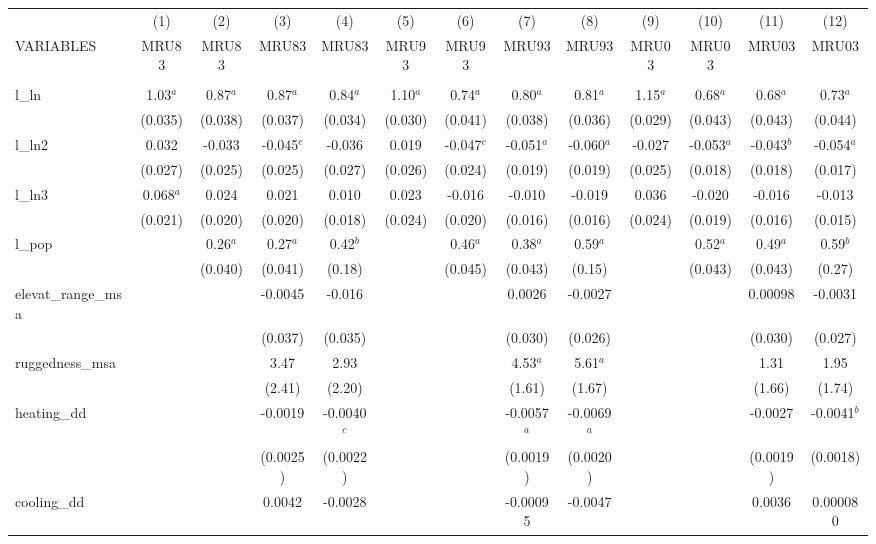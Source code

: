 \documentclass[]{article}
\begin{document}
\begin{tabular}{lcccccccccccc} \hline
 & (1) & (2) & (3) & (4) & (5) & (6) & (7) & (8) & (9) & (10) & (11) & (12) \\
VARIABLES & MRU83 & MRU83 & MRU83 & MRU83 & MRU93 & MRU93 & MRU93 & MRU93 & MRU03 & MRU03 & MRU03 & MRU03 \\ \hline
 &  &  &  &  &  &  &  &  &  &  &  &  \\
l\_ln & 1.03$^a$ & 0.87$^a$ & 0.87$^a$ & 0.84$^a$ & 1.10$^a$ & 0.74$^a$ & 0.80$^a$ & 0.81$^a$ & 1.15$^a$ & 0.68$^a$ & 0.68$^a$ & 0.73$^a$ \\
 & (0.035) & (0.038) & (0.037) & (0.034) & (0.030) & (0.041) & (0.038) & (0.036) & (0.029) & (0.043) & (0.043) & (0.044) \\
l\_ln2 & 0.032 & -0.033 & -0.045$^c$ & -0.036 & 0.019 & -0.047$^c$ & -0.051$^a$ & -0.060$^a$ & -0.027 & -0.053$^a$ & -0.043$^b$ & -0.054$^a$ \\
 & (0.027) & (0.025) & (0.025) & (0.027) & (0.026) & (0.024) & (0.019) & (0.019) & (0.025) & (0.018) & (0.018) & (0.017) \\
l\_ln3 & 0.068$^a$ & 0.024 & 0.021 & 0.010 & 0.023 & -0.016 & -0.010 & -0.019 & 0.036 & -0.020 & -0.016 & -0.013 \\
 & (0.021) & (0.020) & (0.020) & (0.018) & (0.024) & (0.020) & (0.016) & (0.016) & (0.024) & (0.019) & (0.016) & (0.015) \\
l\_pop &  & 0.26$^a$ & 0.27$^a$ & 0.42$^b$ &  & 0.46$^a$ & 0.38$^a$ & 0.59$^a$ &  & 0.52$^a$ & 0.49$^a$ & 0.59$^b$ \\
 &  & (0.040) & (0.041) & (0.18) &  & (0.045) & (0.043) & (0.15) &  & (0.043) & (0.043) & (0.27) \\
elevat\_range\_msa &  &  & -0.0045 & -0.016 &  &  & 0.0026 & -0.0027 &  &  & 0.00098 & -0.0031 \\
 &  &  & (0.037) & (0.035) &  &  & (0.030) & (0.026) &  &  & (0.030) & (0.027) \\
ruggedness\_msa &  &  & 3.47 & 2.93 &  &  & 4.53$^a$ & 5.61$^a$ &  &  & 1.31 & 1.95 \\
 &  &  & (2.41) & (2.20) &  &  & (1.61) & (1.67) &  &  & (1.66) & (1.74) \\
heating\_dd &  &  & -0.0019 & -0.0040$^c$ &  &  & -0.0057$^a$ & -0.0069$^a$ &  &  & -0.0027 & -0.0041$^b$ \\
 &  &  & (0.0025) & (0.0022) &  &  & (0.0019) & (0.0020) &  &  & (0.0019) & (0.0018) \\
cooling\_dd &  &  & 0.0042 & -0.0028 &  &  & -0.00095 & -0.0047 &  &  & 0.0036 & 0.000080 \\

\end{tabular}
\end{document}
